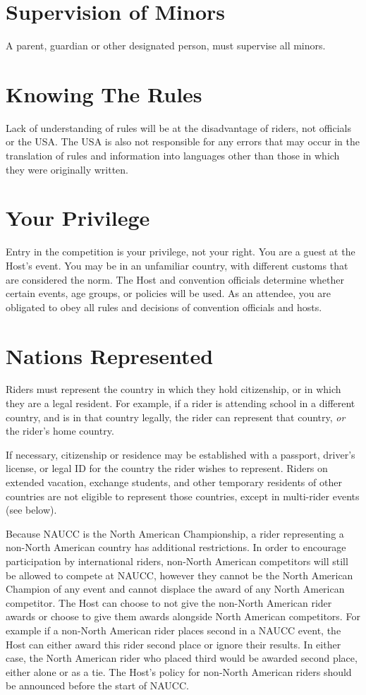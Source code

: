 \section{Supervision of Minors}
A parent, guardian or other designated person, must supervise all minors.

\section{Knowing The Rules}
Lack of understanding of rules will be at the disadvantage of riders, not officials or the USA.
The USA is also not responsible for any errors that may occur in the translation of rules and information into languages other than those in which they were originally written.

\section{Your Privilege}
Entry in the competition is your privilege, not your right.
You are a guest at the Host's event.
You may be in an unfamiliar country, with different customs that are considered the norm.
The Host and convention officials determine whether certain events, age groups, or policies will be used.
As an attendee, you are obligated to obey all rules and decisions of convention officials and hosts.

\section{Nations Represented}
Riders must represent the country in which they hold citizenship, or in which they are a legal resident.
For example, if a rider is attending school in a different country, and is in that country legally, the rider can represent that country, \textit{or} the rider's home country.

If necessary, citizenship or residence may be established with a passport, driver's license, or legal ID for the country the rider wishes to represent.
Riders on extended vacation, exchange students, and other temporary residents of other countries are not eligible to represent those countries, except in multi-rider events (see below).

Because NAUCC is the North American Championship, a rider representing a non-North American country has additional restrictions.
In order to encourage participation by international riders, non-North American competitors will still be allowed to compete at NAUCC, however they cannot be the North American Champion of any event and cannot displace the award of any North American competitor.
The Host can choose to not give the non-North American rider awards or choose to give them awards alongside North American competitors.
For example if a non-North American rider places second in a NAUCC event, the Host can either award this rider second place or ignore their results.
In either case, the North American rider who placed third would be awarded second place, either alone or as a tie.
The Host's policy for non-North American riders should be announced before the start of NAUCC.

